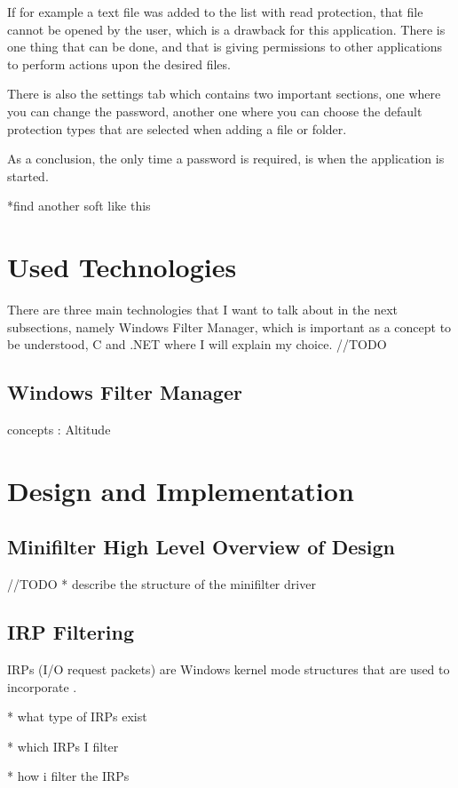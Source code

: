	If for example a text file was added to the list with read protection, that file cannot be opened by the user, which is a drawback for this application. There is one thing that can be done, and that is giving permissions to other applications to perform actions upon the desired files.
	
	There is also the settings tab which contains two important sections, one where you can change the password, another one where you can choose the default protection types that are selected when adding a file or folder.
	
	As a conclusion, the only time a password is required, is when the application is started. 
	
	*find another soft like this
	
	\newpage
	\section{Used Technologies}
		There are three main technologies that I want to talk about in the next subsections, namely Windows Filter Manager, which is important as a concept to be understood, C and .NET where I will explain my choice. //TODO
		\subsection{Windows Filter Manager}
		
		
		concepts : Altitude
		
			
		
	\newpage
	\section{Design and Implementation}
		\subsection{Minifilter High Level Overview of Design}
		//TODO
		* describe the structure of the minifilter driver
		
		\subsection{IRP Filtering}
		IRPs (I/O request packets) are Windows kernel mode structures that are used to incorporate . 
		
		* what type of IRPs exist
		
		* which IRPs I filter
		
		* how i filter the IRPs 
		
